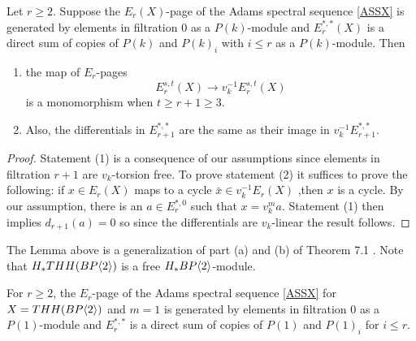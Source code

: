 \begin{lem}\label{mod p v_n}
Let $r\ge 2$. Suppose the $E_r(X)$-page of the Adams spectral sequence \eqref{ASSX} is generated by elements in filtration $0$ as a $P(k)$-module and $E_r^{*,*}(X)$ is a direct sum of copies of $P(k)$ and $P(k)_i$ with $i\le r$ as a $P(k)$-module. Then
\begin{enumerate}
\item{} the map of $E_r$-pages
\[ E_r^{s,t}(X) \to v_k^{-1}E_r^{s,t}(X) \]
is a monomorphism when $t\ge r+1\ge 3$. 
\item{} Also, the differentials in $E_{r+1}^{*,*}$ are the same as their image in $v_k^{-1}E_{r+1}^{*,*}$. 
\end{enumerate}
\end{lem}
\begin{proof}
Statement (1) is a consequence of our assumptions since elements in filtration $r+1$ are $v_k$-torsion free. 
To prove statement (2) it suffices to prove the following: if $x\in E_r(X)$ maps to a cycle $\bar{x}\in v_k^{-1}E_r(X)$ ,then $x$ is a cycle. By our assumption, there is an $a\in E_r^{*,0}$ such that $x=v_k^ma$. Statement (1) then implies $d_{r+1}(a)=0$ so since the differentials are $v_k$-linear the result follows. 
\end{proof}
\begin{rem}
The Lemma above is a generalization of part (a) and (b) of Theorem 7.1 \cite{McClureStaffeldt}. Note that $H_*THH(BP\langle 2 \rangle)$ is a free $H_*BP\langle 2 \rangle$-module.
\end{rem}
\begin{lem} \label{lem mod p v_1}
For $r\ge 2$, the $E_r$-page of the Adams spectral sequence \eqref{ASSX} for $X=THH(BP\langle 2 \rangle)$ and $m=1$ is generated by elements in filtration $0$ as a $P(1)$-module and $E_{r}^{*,*}$ is a direct sum of copies of $P(1)$ and $P(1)_i$ for $i\le r$. 
\end{lem}
